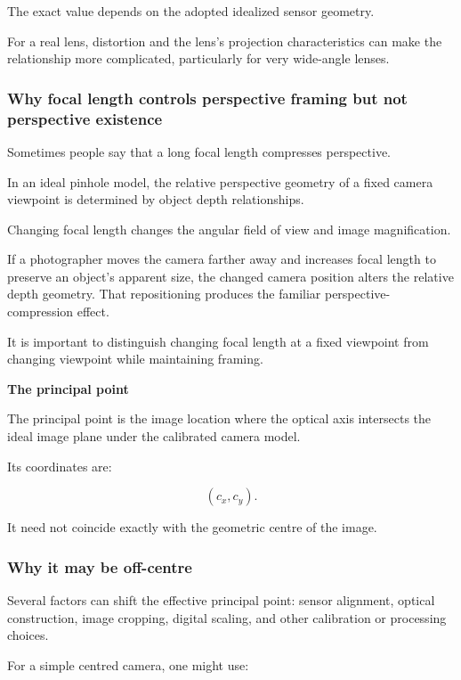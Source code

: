 The exact value depends on the adopted idealized sensor geometry.

For a real lens, distortion and the lens's projection characteristics can make the relationship more complicated, particularly for very wide-angle lenses.

\subsubsection{Why focal length controls perspective framing but not perspective existence}\label{why-focal-length-controls-perspective-framing-but-not-perspective-existence}

Sometimes people say that a long focal length compresses perspective.

In an ideal pinhole model, the relative perspective geometry of a fixed camera viewpoint is determined by object depth relationships.

Changing focal length changes the angular field of view and image magnification.

If a photographer moves the camera farther away and increases focal length to preserve an object's apparent size, the changed camera position alters the relative depth geometry. That repositioning produces the familiar perspective-compression effect.

It is important to distinguish changing focal length at a fixed viewpoint from changing viewpoint while maintaining framing.

\textbf{The principal point}

The principal point is the image location where the optical axis intersects the ideal image plane under the calibrated camera model.

Its coordinates are:

\[
 \boxed{(c_x,c_y)}.
\]

It need not coincide exactly with the geometric centre of the image.

\subsubsection{Why it may be off-centre}\label{why-it-may-be-off-centre}

Several factors can shift the effective principal point: sensor alignment, optical construction, image cropping, digital scaling, and other calibration or processing choices.

For a simple centred camera, one might use:

